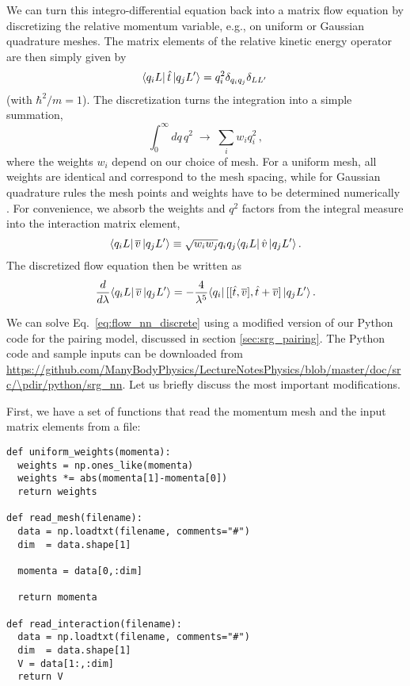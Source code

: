 We can turn this integro-differential equation back into a matrix 
flow equation by discretizing the relative momentum variable, e.g.,
on uniform or Gaussian quadrature meshes. The matrix elements of the 
relative kinetic energy operator are then simply given by
\begin{equation}
  \langle{q_iL}|\,{\hat{t}}\,|{q_jL'}\rangle=q_i^2 \delta_{q_iq_j}\delta_{LL'}\,
\end{equation}
(with $\hbar^2/m=1$). The discretization turns the integration
into a simple summation,
\begin{equation}
  \int_0^\infty dq\,q^2\;\rightarrow\;\sum_{i}w_i q^2_i\,,
\end{equation}
where the weights $w_i$ depend on our choice of mesh. For a uniform
mesh, all weights are identical and correspond to the mesh spacing,
while for Gaussian quadrature rules the mesh points and weights have
to be determined numerically \cite{Press:2007vn}. For convenience,
we absorb the weights and $q^2$ factors from the integral measure into 
the interaction matrix element,
\begin{equation}
  \langle{q_iL}|\,{\overline{v}}\,|{q_jL'}\rangle \equiv \sqrt{w_iw_j}q_i q_j\langle{q_iL}|\,{\hat{v}}\,|{q_jL'}\rangle\,.
\end{equation}
The discretized flow equation then be written as
\begin{equation}\label{eq:flow_nn_discrete}
  \totd{}{\lambda} \matrixe{q_iL}{\overline{v}}{q_jL'} = - \frac{4}{\lambda^5}
    \matrixe{q_i}{\comm{\comm{\tO}{\overline{v}}}{\tO+\overline{v}}}{q_jL'}\,.
\end{equation}

We can solve Eq.~\eqref{eq:flow_nn_discrete} using a modified version of our 
Python code for the pairing model, discussed in section \ref{sec:srg_pairing}.
The Python code and sample inputs can be downloaded from 
\url{https://github.com/ManyBodyPhysics/LectureNotesPhysics/blob/master/doc/src/\pdir/python/srg_nn}.
Let us briefly discuss the most important modifications.

First, we have a set of functions that read the momentum mesh
and the input matrix elements from a file:
\begin{lstlisting}
def uniform_weights(momenta):
  weights = np.ones_like(momenta)
  weights *= abs(momenta[1]-momenta[0])
  return weights

def read_mesh(filename):
  data = np.loadtxt(filename, comments="#")  
  dim  = data.shape[1]
  
  momenta = data[0,:dim]

  return momenta
  
def read_interaction(filename):
  data = np.loadtxt(filename, comments="#")  
  dim  = data.shape[1]
  V = data[1:,:dim]
  return V
\end{lstlisting}

